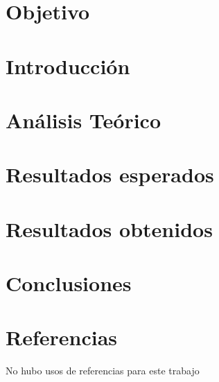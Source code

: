 \documentclass{article}
\begin{document}
\begin{abstract}
	\begin{justify}
		abstract
		\end{justify}
{\it Keywords:}   palabra1, palabra2
\end{abstract}
\begin{multicols}{2}
\section{Objetivo}\label{Objetivo}

\section{Introducción}\label{sec:intro}

\section{Análisis Teórico}\label{sec:analiTeorico}

\section{Resultados esperados}\label{sec:resEsperados}

\section{Resultados obtenidos}\label{sec:resObtenidos}

\section{Conclusiones}\label{sec:conclusion}

\section*{Referencias}\label{sec:referencias}	
No hubo usos de referencias para este trabajo
\end{multicols}
\end{document}
